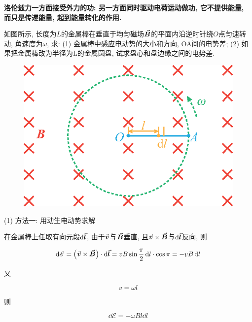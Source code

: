 \textbf{洛伦兹力一方面接受外力的功: 另一方面同时驱动电荷运动做功, 它不提供能量, 而只是传递能量, 起到能量转化的作用. }

\begin{example}
	如图所示, 长度为$L$的金属棒在垂直于均匀磁场$\va*{B}$的平面内沿逆时针绕$O$点匀速转动, 角速度为$\omega$, 求: 
	(1) 金属棒中感应电动势的大小和方向, OA间的电势差; 
	(2) 如果把金属棒改为半径为L的金属圆盘, 试求盘心和盘边缘之间的电势差. 
	
	\begin{figure}[H]
		\centering
		\includegraphics[scale=1.0]{C9-fig2.eps}
	\end{figure}
	
	\begin{solution}
		
		(1) 方法一: 用动生电动势求解
		
		在金属棒上任取有向元段$\dd{\va*{l}}$, 由于$\va*{v}$与$\va*{B}$垂直, 且$\va*{v} \times \va*{B}$与$\dd{\va*{l}}$反向, 则
		
		\begin{equation*}
			\dd{\mathscr{E}} = \qty(\va*{v} \times \va*{B}) \cdot \dd{\va*{l}} = vB\sin \dfrac{\pi}{2} \dd{l} \cdot \cos \pi = -vB \dd{l}
		\end{equation*}
		
		又
		
		\begin{equation*}
			v = \omega l
		\end{equation*}
		
		则
		
		\begin{equation*}
			\dd{\mathscr{E}} = -\omega B l \dd{l}
		\end{equation*}
		

\end{solution}
\end{example}
